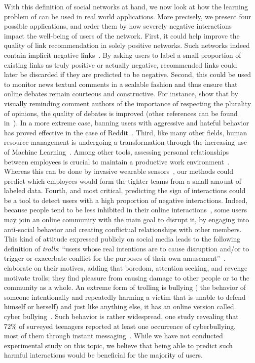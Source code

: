\bigskip

With this definition of social networks at hand, we now look at how the learning problem of \esp{} can be
used in real world applications. More precisely, we present four possible applications, and order
them by how severely negative interactions impact the well-being of users of the network.
First, it could help improve the quality of link recommendation in solely positive networks. Such
networks indeed contain implicit negative links~\autocite{Yang2012}. By asking users to label a
small proportion of existing links as truly positive or actually negative, recommended links could
later be discarded if they are predicted to be negative.
%
Second, this could be used to monitor news textual comments in a scalable fashion and thus ensure
that online debates remain courteous and constructive. For instance, \textcite{betterDebate14} show
that by visually reminding comment authors of the importance of respecting the plurality of
opinions, the quality of debates is improved (other references can be found
in~\autocite{journalism15}). In a more extreme case, banning users with aggressive and hateful
behavior has proved effective in the case of Reddit~\autocite{RedditBan15}.
%
Third, like many other fields, human resource management is undergoing a transformation through the
increasing use of Machine Learning~\autocite{MLinHR16}. Among other tools, assessing personal
relationships between employees is crucial to maintain a productive work
environment~\autocite{friendshipTeam02}. Whereas this
can be done by invasive wearable sensors~\autocite{WearableBehavior09}, our methods could predict
which employees would form the tighter teams from a small amount of labeled data.
%
Fourth, and most critical, predicting the sign of interactions could be a tool to detect users with
a high proportion of negative interactions. Indeed, because people tend to be less inhibited in
their online interactions~\cite{Suler04}, some users may join an online community with the main goal
to disrupt it, by engaging into anti-social behavior and creating conflictual relationships with
other members. This kind of attitude expressed publicly on social media leads to the following
definition of \emph{trolls}: \enquote{users whose real intentions are to cause disruption and/or to
trigger or exacerbate conflict for the purposes of their own amusement}~\autocite{Hardaker10}.
\Textcite{Shachaf10} elaborate on their motives, adding that boredom, attention seeking, and
revenge motivate trolls; they find pleasure from causing damage to other people or to the community
as a whole. An extreme form of trolling is bullying (\ie{} the behavior of someone intentionally and
repeatedly harming a victim that is unable to defend himself or herself) and just like anything
else, it has an online version called cyber bullying~\autocite{cyberbullying13}. Such behavior is
rather widespread, one study revealing that 72\% of  surveyed teenagers reported at least
one occurrence of cyberbullying, most of them through instant messaging~\autocite{Juvonen08}. While
we have not conducted experimental study on this topic, we believe that being able to predict such
harmful interactions would be beneficial for the majority of users.

